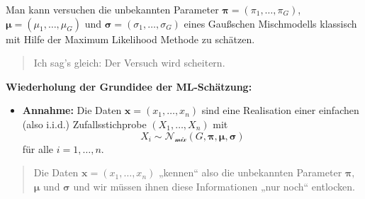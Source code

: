 \documentclass[
  ngerman,
]{book}
\providecommand{\tightlist}{%
  \setlength{\itemsep}{0pt}\setlength{\parskip}{0pt}}
\begin{document}
Man kann versuchen die unbekannten Parameter \(\boldsymbol{\pi}=(\pi_1,\dots,\pi_G)\), \(\boldsymbol{\mu}=(\mu_1,\dots,\mu_G)\) und \(\boldsymbol{\sigma}=(\sigma_1,\dots,\sigma_G)\) eines Gaußschen Mischmodells klassisch mit Hilfe der Maximum Likelihood Methode zu schätzen.

\begin{quote}
Ich sag's gleich: Der Versuch wird scheitern.
\end{quote}

\textbf{Wiederholung der Grundidee der ML-Schätzung:}

\begin{itemize}
\tightlist
\item
  \textbf{Annahme:} Die Daten \(\mathbf{x}=(x_1,\dots,x_n)\) sind eine Realisation einer einfachen (also i.i.d.) Zufallsstichprobe \((X_1,\dots,X_n)\) mit
  \[ 
  X_i\sim\mathcal{N}_{\mathcal{mix}}(G,\boldsymbol{\pi},\boldsymbol{\mu},\boldsymbol{\sigma})
  \]
  für alle \(i=1,\dots,n\).
\end{itemize}

\begin{quote}
Die Daten \(\mathbf{x}=(x_1,\dots,x_n)\) „kennen`` also die unbekannten Parameter \(\boldsymbol{\pi},\) \(\boldsymbol{\mu}\) und \(\boldsymbol{\sigma}\) und wir müssen ihnen diese Informationen „nur noch`` entlocken.
\end{quote}
\end{document}
